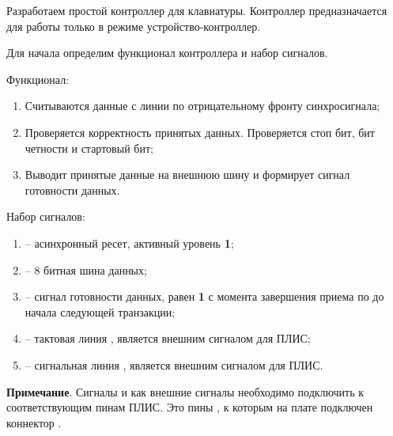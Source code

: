 \vspace{4mm}

\par{Разработаем простой контроллер для клавиатуры. Контроллер предназначается для работы только в режиме устройство-контроллер.}

\par{Для начала определим функционал контроллера и набор сигналов.}

\par{Функционал:}
  \begin{enumerate}[noitemsep,topsep=0pt, after=\vspace{2pt}]
    \item Считываются данные с линии  по отрицательному фронту синхросигнала;
    \item Проверяется корректность принятых данных. Проверяется стоп бит, бит четности и стартовый бит;
    \item Выводит принятые данные на внешнюю шину и формирует сигнал готовности данных.
  \end{enumerate}

\par{Набор сигналов:}
  \begin{enumerate}[noitemsep,topsep=0pt, after=\vspace{2pt}]
    \item {} – асинхронный ресет, активный уровень \textbf{1};
    \item {} – 8 битная шина данных;
    \item {} – сигнал готовности данных, равен \textbf{1} с момента завершения приема по  до начала следующей транзакции;
    \item {} – тактовая линия , является внешним сигналом для ПЛИС;
    \item {} – сигнальная линия , является внешним сигналом для ПЛИС.
  \end{enumerate}

\par{\textbf{Примечание}. Сигналы  и  как внешние сигналы необходимо подключить к соответствующим пинам ПЛИС. Это пины , к которым на плате  подключен коннектор .}




